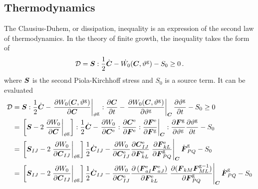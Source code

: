 \documentclass[10pt,letterpaper,oneside]{report}
\newcommand{\ten}[1]{\mbox{\boldmath $#1$}{}}
\newcommand{\scas}[1]{\mbox{{\scriptsize{${\rm{#1}}$}}}{}}
\newcommand{\tens}[1]{\mbox{\boldmath{\scriptsize{$#1$}}}{}}
\begin{document}
\begin{itemize}
\section{Thermodynamics}
The Clausius-Duhem, or dissipation, inequality is an expression of the second law of thermodynamics.  In the theory of finite growth, the inequality takes the form of
\begin{equation}
\mathcal{D} = \ten{S} : \frac{1}{2} \dot{\ten{C}} - \dot{W_0} ( \ten{C}, \vartheta^{\scas{g}} ) - S_0 \geq 0 \, . 
\end{equation}
where $\ten{S}$ is the second Piola-Kirchhoff stress and $S_0$ is a source term. 
It can be evaluated 
\begin{align}
\mathcal{D} ={}& \ten{S} : \frac{1}{2} \dot{\ten{C}} - \left. \frac{ \partial W_0 ( \ten{C}, \vartheta^{\scas{g}} ) }{\partial \ten{C}} \right|_{\vartheta^{\scas{g}}} : \frac{ \partial \ten{C} }{ \partial t } - \left. \frac{\partial W_0 ( \ten{C}, \vartheta^{\scas{g}} ) }{\partial \vartheta^{\scas{g}} } \right|_{\tens{C}} \frac{ \partial \vartheta^{\scas{g}} }{ \partial t } - S_0 \geq 0 
\\
={}& \left[ \ten{S} - 2 \left. \frac{\partial W_0 }{\partial \ten{C}} \right|_{\vartheta^{\scas{g}}} \right] : \frac{1}{2} \dot{\ten{C}} - \left. \frac{\partial W_0}{\partial \ten{C}^{\scas{e}}} : \frac{\partial \ten{C}^{\scas{e}}}{\partial \ten{F}^{\scas{e}}} : \frac{\partial \ten{F}^{\scas{e}}}{\partial \ten{F}^{\scas{g}}} \right|_{\tens{C}} : \frac{ \partial \ten{F}^{\scas{g}} }{ \partial \vartheta^{\scas{g}} } \frac{ \partial \vartheta^{\scas{g}} }{ \partial t } - S_0  
\notag \\
={}& \left[ \ten{S}_{IJ} - 2 \left. \frac{\partial W_0 }{\partial \ten{C}_{IJ}} \right|_{\vartheta^{\scas{g}}} \right] \frac{1}{2} \dot{\ten{C}}_{IJ} - \frac{\partial W_0}{\partial \ten{C}^{\scas{e}}_{IJ}} \frac{\partial \ten{C}^{\scas{e}}_{IJ}}{\partial \ten{F}^{\scas{e}}_{kL}} \left. \frac{\partial \ten{F}^{\scas{e}}_{kL}}{\partial \ten{F}^{\scas{g}}_{PQ}} \right|_{\tens{C}} \dot{\ten{F}}^{\scas{g}}_{PQ} - S_0  
\notag \\
={}& \left[ \ten{S}_{IJ} - 2 \left. \frac{\partial W_0 }{\partial \ten{C}_{IJ}} \right|_{\vartheta^{\scas{g}}} \right] \frac{1}{2} \dot{\ten{C}}_{IJ} - \frac{\partial W_0}{\partial \ten{C}^{\scas{e}}_{IJ}} \frac{\partial \left( \ten{F}^{\scas{e}}_{aI} \ten{F}^{\scas{e}}_{aJ} \right) }{\partial \ten{F}^{\scas{e}}_{kL}} \left. \frac{\partial ( \ten{F}_{kM} \ten{F}^{\scas{g}-1}_{ML} ) }{\partial \ten{F}^{\scas{g}}_{PQ}} \right|_{\tens{C}} \dot{\ten{F}}^{\scas{g}}_{PQ} - S_0  

\end{align}
\end{itemize}
\end{document}
